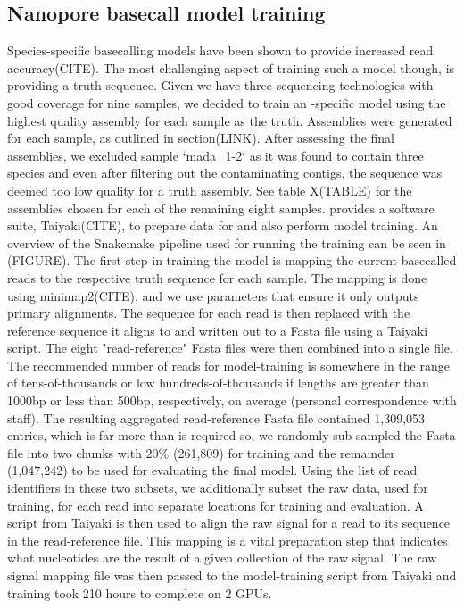 \begin{markdown}
\subsection{Nanopore basecall model training}
Species-specific \ont{} basecalling models have been shown to provide increased read accuracy(CITE). The most challenging aspect of training such a model though, is providing a truth sequence. Given we have three sequencing technologies with good coverage for nine samples, we decided to train an \mtb-specific model using the highest quality assembly for each sample as the truth.  
Assemblies were generated for each sample, as outlined in section(LINK). After assessing the final assemblies, we excluded sample `mada_1-2` as it was found to contain three species and even after filtering out the contaminating contigs, the \mtb{} sequence was deemed too low quality for a truth assembly. See table X(TABLE) for the assemblies chosen for each of the remaining eight samples.  
\ont{} provides a software suite, Taiyaki(CITE), to prepare data for and also perform model training. An overview of the Snakemake pipeline used for running the training can be seen in (FIGURE). The first step in training the model is mapping the current basecalled reads to the respective truth sequence for each sample. The mapping is done using minimap2(CITE), and we use parameters that ensure it only outputs primary alignments. The sequence for each read is then replaced with the reference sequence it aligns to and written out to a Fasta file using a Taiyaki script. The eight "read-reference" Fasta files were then combined into a single file. The recommended number of reads for model-training is somewhere in the range of tens-of-thousands or low hundreds-of-thousands if lengths are greater than 1000bp or less than 500bp, respectively, on average (personal correspondence with \ont{} staff). The resulting aggregated read-reference Fasta file contained 1,309,053 entries, which is far more than is required so, we randomly sub-sampled the Fasta file into two chunks with 20\% (261,809) for training and the remainder (1,047,242) to be used for evaluating the final model. Using the list of read identifiers in these two subsets, we additionally subset the raw data, used for training, for each read into separate locations for training and evaluation. A script from Taiyaki is then used to align the raw signal for a read to its sequence in the read-reference file. This mapping is a vital preparation step that indicates what nucleotides are the result of a given collection of the raw signal. The raw signal mapping file was then passed to the model-training script from Taiyaki and training took 210 hours to complete on 2 GPUs. \\


\end{markdown}
